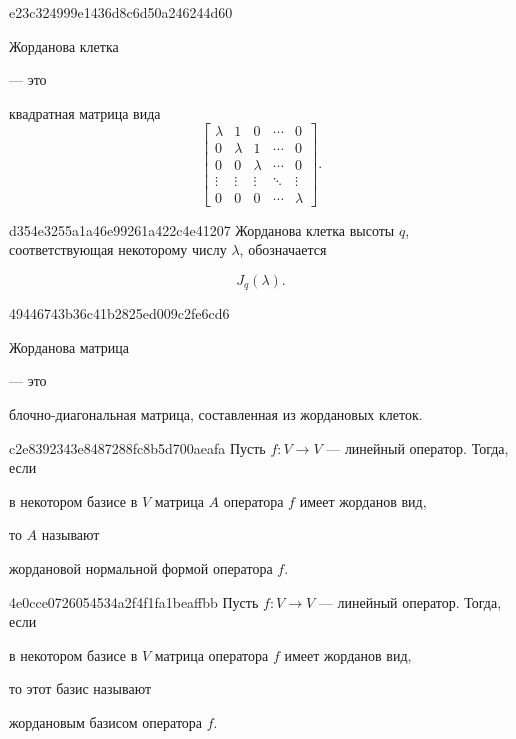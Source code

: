 \begin{note}{e23c324999e1436d8c6d50a246244d60}
    \begin{icloze}{2}Жорданова клетка\end{icloze} --- это \begin{icloze}{1}квадратная матрица вида
    \[
        \begin{bmatrix}
            \lambda & 1 & 0 & \cdots & 0 \\
            0 & \lambda & 1 & \cdots & 0 \\
            0 & 0 & \lambda & \cdots & 0 \\
            \vdots & \vdots & \vdots & \ddots & \vdots \\
            0 & 0 & 0 & \cdots & \lambda
        \end{bmatrix}.
    \]\end{icloze}
\end{note}

\begin{note}{d354e3255a1a46e99261a422c4e41207}
    Жорданова клетка высоты \( q \), соответствующая некоторому числу \( \lambda \), обозначается
    \begin{icloze}{1}
        \[
            J_q (\lambda).
        \]
    \end{icloze}
\end{note}

\begin{note}{49446743b36c41b2825ed009c2fe6cd6}
    \begin{icloze}{2}Жорданова матрица\end{icloze} --- это \begin{icloze}{1}блочно-диагональная матрица, составленная из жордановых клеток.\end{icloze}
\end{note}

\begin{note}{c2e8392343e8487288fc8b5d700aeafa}
    Пусть \( f : V \to V \) --- линейный оператор.
    Тогда, если \begin{icloze}{1}в некотором базисе в \( V \) матрица \( A \) оператора \( f \) имеет жорданов вид,\end{icloze} то \( A \) называют \begin{icloze}{2}жордановой нормальной формой оператора \( f \).\end{icloze}
\end{note}

\begin{note}{4e0cce0726054534a2f4f1fa1beaffbb}
    Пусть \( f : V \to V \) --- линейный оператор.
    Тогда, если \begin{icloze}{1}в некотором базисе в \( V \) матрица оператора \( f \) имеет жорданов вид,\end{icloze} то этот базис называют \begin{icloze}{2}жордановым базисом оператора \( f \).\end{icloze}
\end{note}

